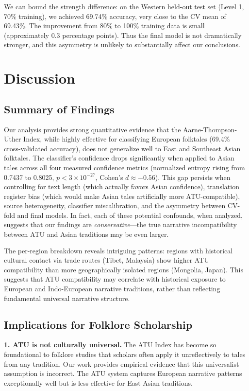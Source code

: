 \documentclass{article}
\begin{document}
We can bound the strength difference: on the Western held-out test set (Level 1, 70\% training), we achieved 69.74\% accuracy, very close to the CV mean of 69.43\%. The improvement from 80\% to 100\% training data is small (approximately 0.3 percentage points). Thus the final model is not dramatically stronger, and this asymmetry is unlikely to substantially affect our conclusions.

\section{Discussion}

\subsection{Summary of Findings}

Our analysis provides strong quantitative evidence that the Aarne-Thompson-Uther Index, while highly effective for classifying European folktales (69.4\% cross-validated accuracy), does not generalize well to East and Southeast Asian folktales. The classifier's confidence drops significantly when applied to Asian tales across all four measured confidence metrics (normalized entropy rising from 0.7437 to 0.8025, $p < 3 \times 10^{-27}$, Cohen's $d \approx -0.56$). This gap persists when controlling for text length (which actually favors Asian confidence), translation register bias (which would make Asian tales artificially more ATU-compatible), source heterogeneity, classifier miscalibration, and the asymmetry between CV-fold and final models. In fact, each of these potential confounds, when analyzed, suggests that our findings are \textit{conservative}---the true narrative incompatibility between ATU and Asian traditions may be even larger.

The per-region breakdown reveals intriguing patterns: regions with historical cultural contact via trade routes (Tibet, Malaysia) show higher ATU compatibility than more geographically isolated regions (Mongolia, Japan). This suggests that ATU compatibility may correlate with historical exposure to European and Indo-European narrative traditions, rather than reflecting fundamental universal narrative structure.

\subsection{Implications for Folklore Scholarship}

\textbf{1. ATU is not culturally universal.} The ATU Index has become so foundational to folklore studies that scholars often apply it unreflectively to tales from any tradition. Our work provides empirical evidence that this universalist assumption is incorrect. The ATU system captures European narrative patterns exceptionally well but is less effective for East Asian traditions.
\end{document}
